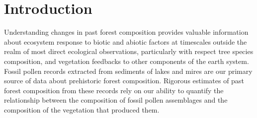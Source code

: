 \documentclass[12pt]{article}
\begin{document}
\section{Introduction}
Understanding changes in past forest composition provides valuable
information about ecosystem response to biotic and abiotic factors at
timescales outside the realm of most direct ecological observations,
particularly with respect tree species composition, and vegetation
feedbacks to other components of the earth system. Fossil pollen
records extracted from sediments of lakes and mires are our primary
source of data about prehistoric forest composition. Rigorous
estimates of past forest composition from these records rely on our
ability to quantify the relationship between the composition of fossil
pollen assemblages and the composition of the vegetation that produced
them.





\end{document}
